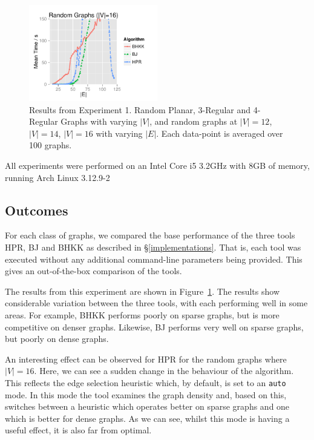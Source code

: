 \begin{figure}[!p]
\includegraphics[width=0.5\textwidth]{data/Exp1_random16_graphs.pdf}
\caption{Results from Experiment 1.  Random Planar, 3-Regular and 4-Regular Graphs with varying $|V|$, and random graphs at $|V|= 12$, $|V|= 14$, $|V|= 16$ with varying $|E|$.  Each data-point is averaged over 100 graphs.}
\label{experiment_1}
\end{figure}

All experiments were performed on an Intel Core i5 3.2GHz with 8GB of memory, running Arch Linux 3.12.9-2

\subsection{Outcomes} 

For each class of graphs, we compared the base performance of the three tools HPR, BJ and BHKK as described in
 \S\ref{implementations}.  That is, each tool was executed without any additional command-line parameters being provided.  This gives an out-of-the-box comparison of the tools.
 
The results from this experiment are shown in Figure~\ref{experiment_1}.  The results show considerable variation between the three tools, with each performing well in some areas.  For example, BHKK performs poorly on sparse graphs, but is more competitive on denser graphs.  Likewise, BJ performs very well on sparse graphs, but poorly on dense graphs. 

An interesting effect can be observed for HPR for the random graphs where $|V|=16$.  Here, we can see a sudden change in the behaviour of the algorithm.  This reflects the edge selection heuristic which, by default, is set to an \verb+auto+ mode.  In this mode the tool examines the graph density and, based on this, switches between a heuristic which operates better on sparse graphs and one which is better for dense graphs.  As we can see, whilst this mode is having a useful effect, it is also far from optimal.

